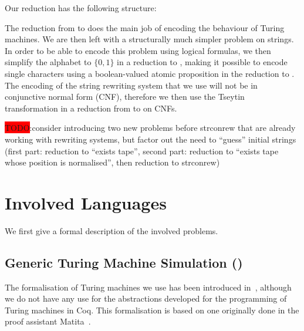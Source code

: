 \documentclass[a4paper,UKenglish,cleveref, autoref]{lipics-v2019}
\newcommand{\TODO}[1]{\colorbox{red}{\LARGE TODO}:#1}
\begin{document}
Our reduction has the following structure: 
\begin{center}
\end{center}

The reduction from \gennp{} to \strconrew{} does the main job of encoding the behaviour of Turing machines. We are then left with a structurally much simpler problem on strings. 
In order to be able to encode this problem using logical formulas, we then simplify the alphabet to $\{0, 1\}$ in a reduction to \binstrconrew, making it possible to encode single characters using a boolean-valued atomic proposition in the reduction to \csat. The encoding of the string rewriting system that we use will not be in conjunctive normal form (CNF), therefore we then use the Tseytin transformation in a reduction from \csat{} to \sat{} on CNFs. 

\TODO{consider introducing two new problems before strconrew that are already working with rewriting systems, but factor out the need to ``guess'' initial strings (first part: reduction to ``exists tape'', second part: reduction to ``exists tape whose position is normalised'', then reduction to strconrew)}

\section{Involved Languages}
We first give a formal description of the involved problems. 

\subsection*{Generic Turing Machine Simulation (\gennp{})}
The formalisation of Turing machines we use has been introduced in~\cite{ForsterEtAl:2019:VerifiedTMs}, although we do not have any use for the abstractions developed for the programming of Turing machines in Coq. This formalisation is based on one originally done in the proof assistant Matita~\cite{Asperti2015AFO}. 
\end{document}
